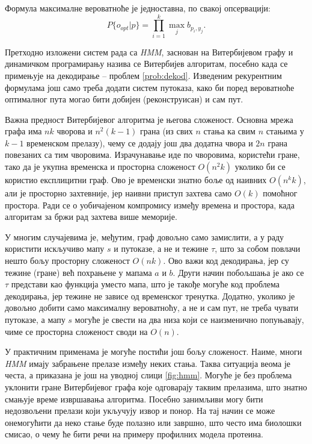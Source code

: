 \documentclass[12pt,oneside]{memoir}
\begin{document}
\begin{CJK}{UTF8}{ipxm}
Формула максималне вероватноће је једноставна, по свакој опсервацији: $$P\{o_{opt} | p\} = \prod_{i=1}^k \max_j b_{p_i, y_j}.$$

Претходно изложени систем рада са \textit{HMM}, заснован на Витербијевом графу и динамичком програмирању назива се Витербијев алгоритам, посебно када се примењује на декодирање -- проблем \ref{prob:dekod}. Изведеним рекурентним формулама још само треба додати систем путоказа, како би поред вероватноће оптималног пута могао бити добијен (реконструисан) и сам пут.

Важна предност Витербијевог алгоритма је његова сложеност. Основна мрежа графа има $nk$ чворова и $n^2 (k-1)$ грана (из свих $n$ стања ка свим $n$ стањима у $k-1$ временском прелазу), чему се додају још два додатна чвора и $2n$ грана повезаних са тим чворовима. Израчунавање иде по чворовима, користећи гране, тако да је укупна временска и просторна сложеност $O(n^2 k)$ уколико би се користио експлицитни граф. Ово је временски знатно боље од наивних $O(n^k k)$, али је просторно захтевније, јер наивни приступ захтева само $O(k)$ помоћног простора. Ради се о уобичајеном компромису између времена и простора, када алгоритам за бржи рад захтева више меморије.

У многим случајевима је, међутим, граф довољно само замислити, а у раду користити искључиво мапу $s$ и путоказе, а не и тежине $\tau$, што за собом повлачи нешто бољу просторну сложеност $O(nk)$. Ово важи код декодирања, јер су тежине (гране) већ похрањене у мапама $a$ и $b$. Други начин побољшања је ако се $\tau$ представи као функција уместо мапа, што је такође могуће код проблема декодирања, јер тежине не зависе од временског тренутка. Додатно, уколико је довољно добити само максималну вероватноћу, а не и сам пут, не треба чувати путоказе, а мапу $s$ могуће је свести на два низа који се наизменично попуњавају, чиме се просторна сложеност своди на $O(n)$.

У практичним применама је могуће постићи још бољу сложеност. Наиме, многи \textit{HMM} имају забрањене прелазе између неких стања. Таква ситуација веома је честа, а приказана је још на уводној слици \ref{fig:hmm}. Могуће је без проблема уклонити гране Витербијевог графа које одговарају таквим прелазима, што знатно смањује време извршавања алгоритма. Посебно занимљиви могу бити недозвољени прелази који укључују извор и понор. На тај начин се може онемогућити да неко стање буде полазно или завршно, што често има биолошки смисао, о чему ће бити речи на примеру профилних модела протеина.


\end{CJK}
\end{document}
